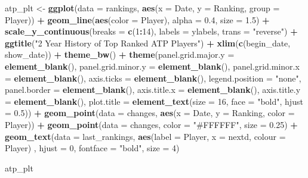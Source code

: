 \documentclass[]{book}
\newenvironment{Shaded}{\begin{snugshade}}{\end{snugshade}}
\newcommand{\DataTypeTok}[1]{\textcolor[rgb]{0.13,0.29,0.53}{#1}}
\newcommand{\DecValTok}[1]{\textcolor[rgb]{0.00,0.00,0.81}{#1}}
\newcommand{\FloatTok}[1]{\textcolor[rgb]{0.00,0.00,0.81}{#1}}
\newcommand{\KeywordTok}[1]{\textcolor[rgb]{0.13,0.29,0.53}{\textbf{#1}}}
\newcommand{\NormalTok}[1]{#1}
\newcommand{\OperatorTok}[1]{\textcolor[rgb]{0.81,0.36,0.00}{\textbf{#1}}}
\newcommand{\StringTok}[1]{\textcolor[rgb]{0.31,0.60,0.02}{#1}}
\begin{document}
\begin{Shaded}
\begin{Highlighting}[]
\NormalTok{atp_plt <-}\StringTok{ }\KeywordTok{ggplot}\NormalTok{(}\DataTypeTok{data =}\NormalTok{ rankings, }\KeywordTok{aes}\NormalTok{(}\DataTypeTok{x =}\NormalTok{ Date, }\DataTypeTok{y =}\NormalTok{ Ranking, }\DataTypeTok{group =}\NormalTok{ Player)) }\OperatorTok{+}\StringTok{ }
\StringTok{  }\KeywordTok{geom_line}\NormalTok{(}\KeywordTok{aes}\NormalTok{(}\DataTypeTok{color =}\NormalTok{ Player), }\DataTypeTok{alpha =} \FloatTok{0.4}\NormalTok{, }\DataTypeTok{size =} \FloatTok{1.5}\NormalTok{) }\OperatorTok{+}
\StringTok{  }\KeywordTok{scale_y_continuous}\NormalTok{(}\DataTypeTok{breaks =} \KeywordTok{c}\NormalTok{(}\DecValTok{1}\OperatorTok{:}\DecValTok{14}\NormalTok{), }\DataTypeTok{labels =}\NormalTok{ ylabels, }\DataTypeTok{trans =} \StringTok{"reverse"}\NormalTok{) }\OperatorTok{+}\StringTok{ }
\StringTok{  }\KeywordTok{ggtitle}\NormalTok{(}\StringTok{"2 Year History of Top Ranked ATP Players"}\NormalTok{) }\OperatorTok{+}\StringTok{ }
\StringTok{  }\KeywordTok{xlim}\NormalTok{(}\KeywordTok{c}\NormalTok{(begin_date, show_date)) }\OperatorTok{+}
\StringTok{  }\KeywordTok{theme_bw}\NormalTok{() }\OperatorTok{+}\StringTok{ }
\StringTok{  }\KeywordTok{theme}\NormalTok{(}\DataTypeTok{panel.grid.major.y =} \KeywordTok{element_blank}\NormalTok{(), }\DataTypeTok{panel.grid.minor.y =} \KeywordTok{element_blank}\NormalTok{(),}
        \DataTypeTok{panel.grid.minor.x =} \KeywordTok{element_blank}\NormalTok{(), }\DataTypeTok{axis.ticks =} \KeywordTok{element_blank}\NormalTok{(), }
        \DataTypeTok{legend.position =} \StringTok{"none"}\NormalTok{, }\DataTypeTok{panel.border =} \KeywordTok{element_blank}\NormalTok{(),}
        \DataTypeTok{axis.title.x =} \KeywordTok{element_blank}\NormalTok{(), }\DataTypeTok{axis.title.y =} \KeywordTok{element_blank}\NormalTok{(),}
        \DataTypeTok{plot.title =} \KeywordTok{element_text}\NormalTok{(}\DataTypeTok{size =} \DecValTok{16}\NormalTok{, }\DataTypeTok{face =} \StringTok{"bold"}\NormalTok{, }\DataTypeTok{hjust =} \FloatTok{0.5}\NormalTok{)) }\OperatorTok{+}\StringTok{ }\KeywordTok{geom_point}\NormalTok{(}\DataTypeTok{data =}\NormalTok{ changes, }\KeywordTok{aes}\NormalTok{(}\DataTypeTok{x =}\NormalTok{ Date, }\DataTypeTok{y =}\NormalTok{ Ranking, }\DataTypeTok{color =}\NormalTok{ Player)) }\OperatorTok{+}
\StringTok{  }\KeywordTok{geom_point}\NormalTok{(}\DataTypeTok{data =}\NormalTok{ changes, }\DataTypeTok{color =} \StringTok{"#FFFFFF"}\NormalTok{, }\DataTypeTok{size =} \FloatTok{0.25}\NormalTok{) }\OperatorTok{+}\StringTok{ }\KeywordTok{geom_text}\NormalTok{(}\DataTypeTok{data =}\NormalTok{ last_rankings,}
            \KeywordTok{aes}\NormalTok{(}\DataTypeTok{label =}\NormalTok{ Player, }\DataTypeTok{x =}\NormalTok{ nextd,  }\DataTypeTok{colour =}\NormalTok{ Player) , }\DataTypeTok{hjust =} \DecValTok{0}\NormalTok{,}
            \DataTypeTok{fontface =} \StringTok{"bold"}\NormalTok{, }\DataTypeTok{size =} \DecValTok{4}\NormalTok{)}

\NormalTok{atp_plt}
\end{Highlighting}
\end{Shaded}
\end{document}
